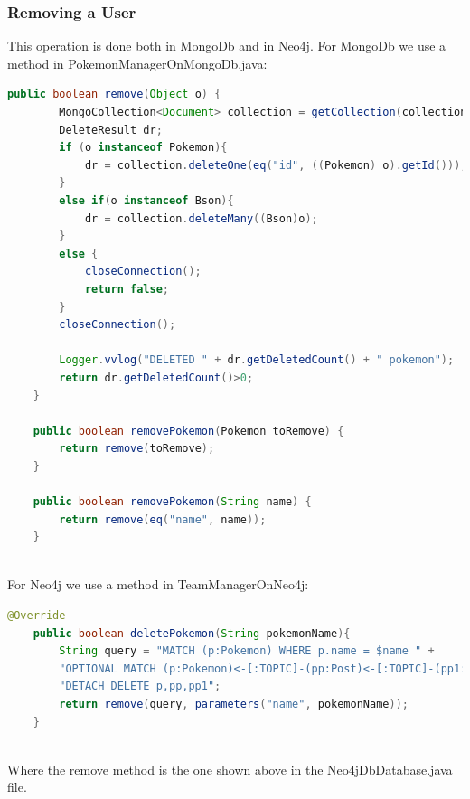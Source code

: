 \subsubsection{Removing a User}
This operation is done both in MongoDb and in Neo4j.
For MongoDb we use a method in PokemonManagerOnMongoDb.java:
\begin{lstlisting}[language=Java]
	public boolean remove(Object o) {
		MongoCollection<Document> collection = getCollection(collectionName);
		DeleteResult dr;
		if (o instanceof Pokemon){
			dr = collection.deleteOne(eq("id", ((Pokemon) o).getId()));
		}
		else if(o instanceof Bson){
			dr = collection.deleteMany((Bson)o);
		}
		else {
			closeConnection();
			return false;
		}
		closeConnection();
		
		Logger.vvlog("DELETED " + dr.getDeletedCount() + " pokemon");
		return dr.getDeletedCount()>0;
	}
	
	public boolean removePokemon(Pokemon toRemove) {
		return remove(toRemove);
	}
	
	public boolean removePokemon(String name) {
		return remove(eq("name", name));
	}
	
\end{lstlisting}

For Neo4j we use a method in TeamManagerOnNeo4j:
\begin{lstlisting}[language=Java]
	@Override
	public boolean deletePokemon(String pokemonName){
		String query = "MATCH (p:Pokemon) WHERE p.name = $name " +
		"OPTIONAL MATCH (p:Pokemon)<-[:TOPIC]-(pp:Post)<-[:TOPIC]-(pp1:Post)" +
		"DETACH DELETE p,pp,pp1";
		return remove(query, parameters("name", pokemonName));
	}
	
\end{lstlisting}

Where the remove method is the one shown above in the Neo4jDbDatabase.java file.

